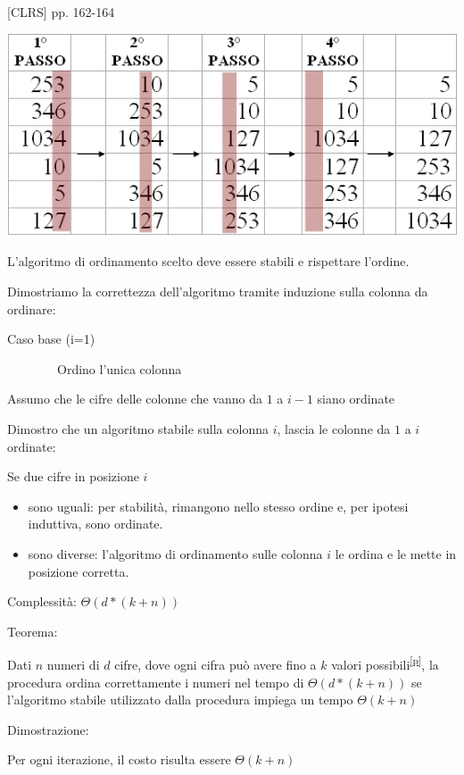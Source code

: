 \documentclass[tikz]{article}
\providecommand{\tightlist}{%
  \setlength{\itemsep}{0pt}\setlength{\parskip}{0pt}}
\begin{document}
{{[}CLRS{]} pp. 162-164}

{\includegraphics{images/image540.png}}

{L'algoritmo di ordinamento scelto deve essere stabili e rispettare l'ordine.}



{Dimostriamo la correttezza dell'algoritmo tramite induzione sulla colonna da ordinare:}

{Caso base (i=1)}

{~~~~~~~~Ordino l'unica colonna}

{Assumo che le cifre delle colonne che vanno da $1$ a $i-1$ siano ordinate}

{Dimostro che un algoritmo stabile sulla colonna $i$, lascia le colonne da $1$ a $i$ ordinate:}

{Se due cifre in posizione $i$}

\begin{itemize}
\tightlist
\item
  {sono uguali: per stabilità, rimangono nello stesso ordine e, per ipotesi induttiva, sono ordinate.}
\item
  {sono diverse: l'algoritmo di ordinamento sulle colonna $i$ le ordina e le mette in posizione corretta.}
\end{itemize}

{Complessità: $\Theta(d*(k+n))$}

{Teorema: }

{Dati $n$ numeri di $d$ cifre, dove ogni cifra può avere fino a $k$ valori possibili}\textsuperscript{\protect\hyperlink{cmnt16}{{[}p{]}}}{, la procedura ordina correttamente i numeri nel tempo di $\Theta(d*(k+n))$ se l'algoritmo stabile utilizzato dalla procedura impiega un tempo $\Theta(k+n)$}

{Dimostrazione:}

{Per ogni iterazione, il costo risulta essere $\Theta(k+n)$}
\end{document}
